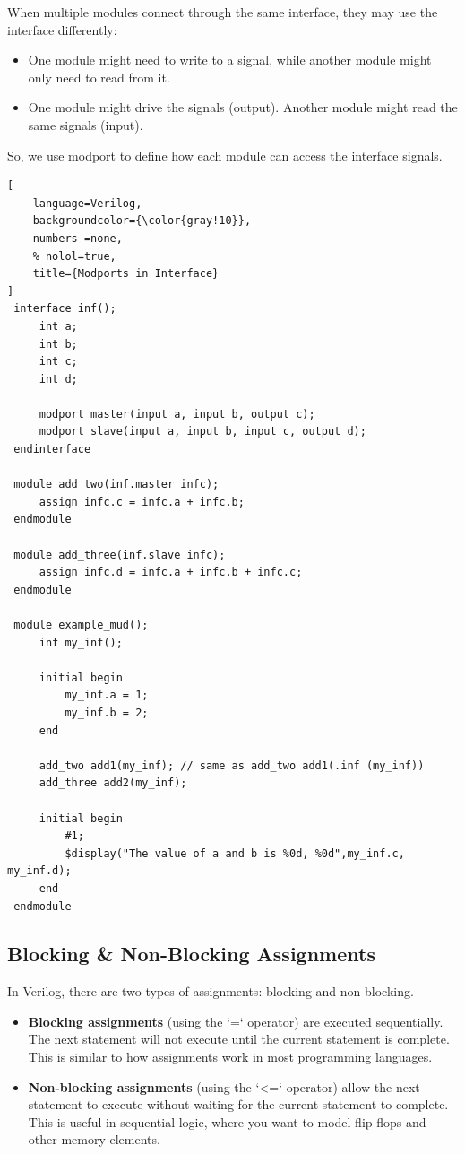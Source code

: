 \documentclass[12pt, a4paper]{article}
\begin{document}
\vspace{0.3em}

When multiple modules connect through the same interface, they may use the interface differently:

\begin{itemize}[nosep]
    \item One module might need to write to a signal, while another module might only need to read from it.
    \item One module might drive the signals (output). Another module might read the same signals (input).
\end{itemize}

\vspace{0.3em}

So, we use modport to define how each module can access the interface signals.

\begin{lstlisting}[
    language=Verilog,
    backgroundcolor={\color{gray!10}},
    numbers =none,
    % nolol=true,
    title={Modports in Interface}
]
 interface inf();
     int a;
     int b;
     int c;
     int d;
     
     modport master(input a, input b, output c);
     modport slave(input a, input b, input c, output d);
 endinterface
 
 module add_two(inf.master infc);
     assign infc.c = infc.a + infc.b;
 endmodule
 
 module add_three(inf.slave infc);
     assign infc.d = infc.a + infc.b + infc.c;
 endmodule
 
 module example_mud();
     inf my_inf();
     
     initial begin
         my_inf.a = 1;
         my_inf.b = 2;
     end
     
     add_two add1(my_inf); // same as add_two add1(.inf (my_inf))
     add_three add2(my_inf);
     
     initial begin
         #1;
         $display("The value of a and b is %0d, %0d",my_inf.c, my_inf.d);
     end
 endmodule
\end{lstlisting}

\subsection{Blocking \& Non-Blocking Assignments}

In Verilog, there are two types of assignments: blocking and non-blocking.

\begin{itemize}
    \item \textbf{Blocking assignments} (using the `=` operator) are executed sequentially. The next statement will not execute until the current statement is complete. This is similar to how assignments work in most programming languages.
    \item \textbf{Non-blocking assignments} (using the `<=` operator) allow the next statement to execute without waiting for the current statement to complete. This is useful in sequential logic, where you want to model flip-flops and other memory elements.
\end{itemize}
\end{document}
